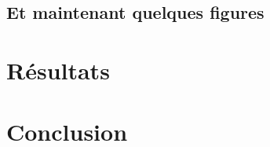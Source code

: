 \documentclass[a4paper, french]{article}
\begin{document}
\subsection{Et maintenant quelques figures}



\section{Résultats}

\section{Conclusion}
\end{document}
